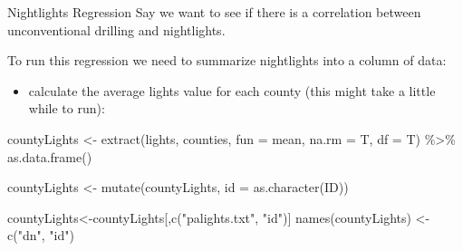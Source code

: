 \documentclass[
  ignorenonframetext,
]{beamer}
\newenvironment{Shaded}{\begin{snugshade}}{\end{snugshade}}
\newcommand{\AttributeTok}[1]{\textcolor[rgb]{0.77,0.63,0.00}{#1}}
\newcommand{\FunctionTok}[1]{\textcolor[rgb]{0.00,0.00,0.00}{#1}}
\newcommand{\NormalTok}[1]{#1}
\newcommand{\OtherTok}[1]{\textcolor[rgb]{0.56,0.35,0.01}{#1}}
\newcommand{\SpecialCharTok}[1]{\textcolor[rgb]{0.00,0.00,0.00}{#1}}
\newcommand{\StringTok}[1]{\textcolor[rgb]{0.31,0.60,0.02}{#1}}
\providecommand{\tightlist}{%
  \setlength{\itemsep}{0pt}\setlength{\parskip}{0pt}}
\begin{document}
\begin{frame}[fragile]{Nightlights Regression}
\protect\hypertarget{nightlights-regression}{}
Say we want to see if there is a correlation between unconventional
drilling and nightlights.

To run this regression we need to summarize nightlights into a column of
data:

\begin{itemize}
\tightlist
\item
  calculate the average lights value for each county (this might take a
  little while to run):
\end{itemize}

\tiny

\begin{Shaded}
\begin{Highlighting}[]
\NormalTok{countyLights }\OtherTok{\textless{}{-}} \FunctionTok{extract}\NormalTok{(lights, counties, }\AttributeTok{fun =}\NormalTok{ mean, }\AttributeTok{na.rm =}\NormalTok{ T, }\AttributeTok{df =}\NormalTok{ T) }\SpecialCharTok{\%\textgreater{}\%}
        \FunctionTok{as.data.frame}\NormalTok{()}

\NormalTok{countyLights }\OtherTok{\textless{}{-}} \FunctionTok{mutate}\NormalTok{(countyLights, }\AttributeTok{id =} \FunctionTok{as.character}\NormalTok{(ID)) }

\NormalTok{countyLights}\OtherTok{\textless{}{-}}\NormalTok{countyLights[,}\FunctionTok{c}\NormalTok{(}\StringTok{"palights.txt"}\NormalTok{, }\StringTok{"id"}\NormalTok{)]}
\FunctionTok{names}\NormalTok{(countyLights) }\OtherTok{\textless{}{-}} \FunctionTok{c}\NormalTok{(}\StringTok{"dn"}\NormalTok{, }\StringTok{"id"}\NormalTok{)}
\end{Highlighting}
\end{Shaded}
\end{frame}
\end{document}
